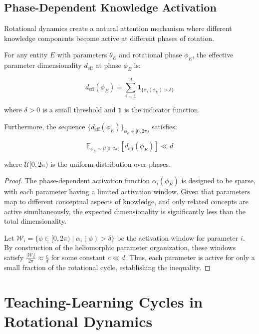 \subsection{Phase-Dependent Knowledge Activation}

Rotational dynamics create a natural attention mechanism where different knowledge components become active at different phases of rotation.

\begin{theorem}
For any entity $E$ with parameters $\theta_E$ and rotational phase $\phi_E$, the effective parameter dimensionality $d_{\text{eff}}$ at phase $\phi_E$ is:

\begin{equation}
d_{\text{eff}}(\phi_E) = \sum_{i=1}^d \mathbf{1}_{\{\alpha_i(\phi_E) > \delta\}}
\end{equation}

where $\delta > 0$ is a small threshold and $\mathbf{1}$ is the indicator function.

Furthermore, the sequence $\{d_{\text{eff}}(\phi_E)\}_{\phi_E \in [0, 2\pi)}$ satisfies:

\begin{equation}
\mathbb{E}_{\phi_E \sim \mathcal{U}[0, 2\pi)}[d_{\text{eff}}(\phi_E)] \ll d
\end{equation}

where $\mathcal{U}[0, 2\pi)$ is the uniform distribution over phases.
\end{theorem}

\begin{proof}
The phase-dependent activation function $\alpha_i(\phi_E)$ is designed to be sparse, with each parameter having a limited activation window. Given that parameters map to different conceptual aspects of knowledge, and only related concepts are active simultaneously, the expected dimensionality is significantly less than the total dimensionality.

Let $\mathcal{W}_i = \{\phi \in [0, 2\pi) \mid \alpha_i(\phi) > \delta\}$ be the activation window for parameter $i$. By construction of the heliomorphic parameter organization, these windows satisfy $\frac{|\mathcal{W}_i|}{2\pi} \approx \frac{c}{d}$ for some constant $c \ll d$. Thus, each parameter is active for only a small fraction of the rotational cycle, establishing the inequality.
\end{proof}

\section{Teaching-Learning Cycles in Rotational Dynamics}

